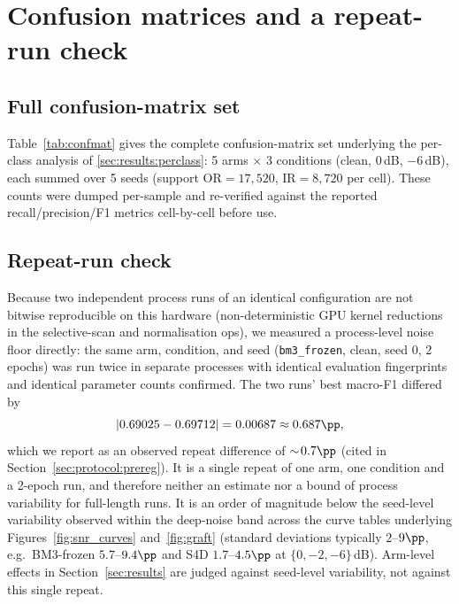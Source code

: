 \section{Confusion matrices and a repeat-run check}
\label{app:confusion}

\subsection{Full confusion-matrix set}
\label{app:confusion:matrices}

Table~\ref{tab:confmat} gives the complete confusion-matrix set underlying the per-class analysis of \ref{sec:results:perclass}: 5 arms $\times$ 3 conditions (clean, $0$\,dB, $-6$\,dB), each summed over 5 seeds (support OR$=17{,}520$, IR$=8{,}720$ per cell). These counts were dumped per-sample and re-verified against the reported recall/precision/F1 metrics cell-by-cell before use.

\onecolumn\twocolumn

\subsection{Repeat-run check}
\label{app:confusion:floor}

Because two independent process runs of an identical configuration are not bitwise reproducible on this hardware (non-deterministic GPU kernel reductions in the selective-scan and normalisation ops), we measured a process-level noise floor directly: the same arm, condition, and seed (\texttt{bm3\_frozen}, clean, seed 0, 2 epochs) was run twice in separate processes with identical evaluation fingerprints and identical parameter counts confirmed. The two runs' best macro-F1 differed by
\[
|0.69025 - 0.69712| = 0.00687 \approx 0.687\pp,
\]
which we report as an observed repeat difference of $\sim\!0.7\pp$ (cited in Section~\ref{sec:protocol:prereg}). It is a single repeat of one arm, one condition and a 2-epoch run, and therefore neither an estimate nor a bound of process variability for full-length runs. It is an order of magnitude below the seed-level variability observed within the deep-noise band across the curve tables underlying Figures~\ref{fig:snr_curves} and~\ref{fig:graft} (standard deviations typically $2$--$9\pp$, e.g.\ BM3-frozen $5.7$--$9.4\pp$ and S4D $1.7$--$4.5\pp$ at $\{0,-2,-6\}$\,dB). Arm-level effects in Section~\ref{sec:results} are judged against seed-level variability, not against this single repeat.
